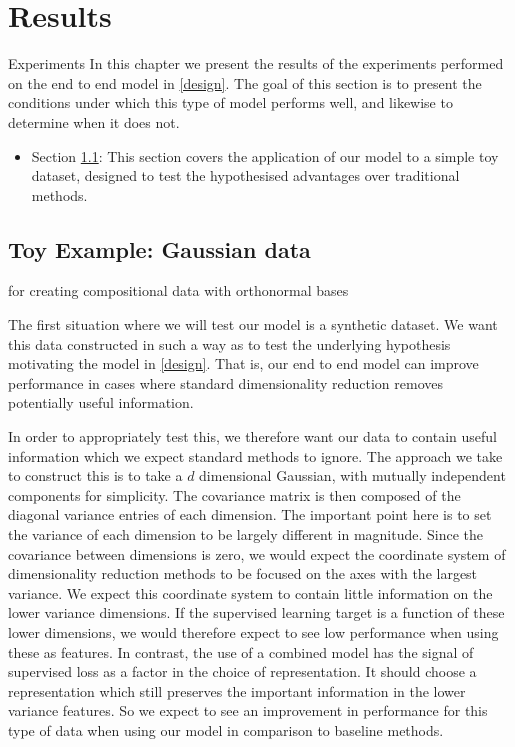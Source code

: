 \chapter{Results}
\label{cha:result}
Experiments 
In this chapter we present the results of the experiments performed on the end to end model in \ref{design}. The goal of this section is to  present the conditions under which this type of model performs well, and likewise to determine when it does not. 

\begin{itemize}
    \item Section \ref{toygauss}: This section covers the application of our model to a simple toy dataset, designed to test the hypothesised advantages over traditional methods.
    
 
\end{itemize} \pagebreak



\section{Toy Example: Gaussian data}
\label{toygauss}
for creating compositional data with orthonormal bases

The first situation where we will test our model is a synthetic dataset. We want this data constructed in such a way as to test the underlying hypothesis motivating the model in \ref{design}. That is, our end to end model can improve performance in cases where standard dimensionality reduction removes potentially useful information.

In order to appropriately test this, we therefore want our data to contain useful information which we expect standard methods to ignore. The approach we take to construct this is to take a $d$ dimensional Gaussian, with mutually independent components for simplicity. The covariance matrix is then composed of the diagonal variance entries of each dimension. The important point here is to set the variance of each dimension to be largely different in magnitude. Since the covariance between dimensions is zero, we would expect the coordinate system of dimensionality reduction methods to be focused on the axes with the largest variance. We expect this coordinate system to contain little information on the lower variance dimensions.  If the supervised learning target is a function of these lower dimensions, we would therefore expect to see low performance when using these as features. In contrast, the use of a combined model has the signal of supervised loss as a factor in the choice of representation. It should choose a representation which still preserves the important information in the lower variance features. So we expect to see an improvement in performance for this type of data when using our model in comparison to baseline methods. \\

